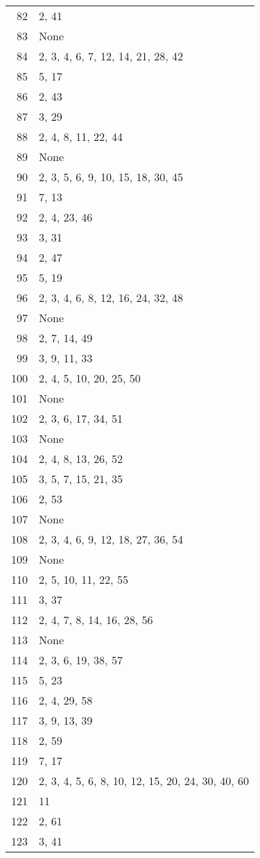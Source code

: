 \documentclass[12pt]{article}
\begin{document}
\begin{tabular}{|r|l|}
82 & 2, 41 \\ 
83 & None \\ 
84 & 2, 3, 4, 6, 7, 12, 14, 21, 28, 42 \\ 
85 & 5, 17 \\ 
86 & 2, 43 \\ 
87 & 3, 29 \\ 
88 & 2, 4, 8, 11, 22, 44 \\ 
89 & None \\ 
90 & 2, 3, 5, 6, 9, 10, 15, 18, 30, 45 \\ 
91 & 7, 13 \\ 
92 & 2, 4, 23, 46 \\ 
93 & 3, 31 \\ 
94 & 2, 47 \\ 
95 & 5, 19 \\ 
96 & 2, 3, 4, 6, 8, 12, 16, 24, 32, 48 \\ 
97 & None \\ 
98 & 2, 7, 14, 49 \\ 
99 & 3, 9, 11, 33 \\ 
100 & 2, 4, 5, 10,  20, 25, 50 \\ 
101 & None \\ 
102 & 2, 3, 6, 17, 34, 51 \\ 
103 & None \\ 
104 & 2, 4, 8, 13, 26, 52 \\ 
105 & 3, 5, 7, 15, 21, 35 \\ 
106 & 2,  53 \\ 
107 & None \\ 
108 & 2, 3, 4, 6, 9, 12, 18, 27, 36, 54 \\ 
109 & None \\ 
110 & 2, 5, 10, 11, 22, 55 \\ 
111 & 3, 37 \\ 
112 & 2, 4, 7, 8, 14, 16, 28, 56 \\ 
113 & None \\ 
114 & 2, 3,  6, 19, 38, 57 \\ 
115 & 5, 23 \\ 
116 & 2, 4, 29, 58 \\ 
117 & 3, 9, 13, 39 \\ 
118 & 2, 59 \\ 
119 & 7, 17 \\ 
120 & 2, 3, 4, 5, 6, 8, 10, 12, 15, 20, 24, 30,  40, 60 \\ 
121 & 11 \\ 
122 & 2, 61 \\ 
123 & 3, 41 \\ 

\end{tabular}
\end{document}
